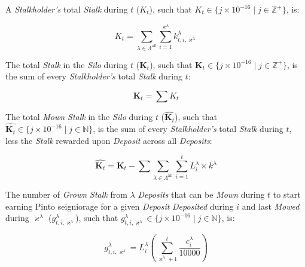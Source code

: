 \documentclass[tikz]{article}
\makeatletter
\newenvironment{keepunit}{%
  \par\penalty0\begingroup
  \edef\keepunitparskip{\the\parskip}%
  \noindent\begin{minipage}[t]{\linewidth}%
  \setlength{\parskip}{\keepunitparskip}%
  \@minipagefalse
}{%
  \end{minipage}\par\endgroup
}
\newcommand{\term}[1]{\textsl{#1}}
\makeatother
\begin{document}
\begin{keepunit}

A \term{Stalkholder's} total \term{Stalk} during $t$ ($K_{t}$), such that $K_{t} \in \{j \times 10^{-16} \mid j \in \mathbb{Z}^{+} \}$, is:

    $$
        K_{t} = 
            \sum_{\lambda \in \Lambda^{\text{all}}}
                \sum_{i=1}^{\varkappa^{\lambda}}
                    k_{t,i,\varkappa^{\lambda}}^{\lambda}
    $$
\end{keepunit}



\begin{keepunit}

The total \term{Stalk} in the \term{Silo} during $t$ ($\mathbf{K}_{t}$), such that $\mathbf{K}_{t} \in \{j \times 10^{-16} \mid j \in \mathbb{Z}^{+} \}$, is the sum of every \term{Stalkholder's} total \term{Stalk} during $t$:

    $$
        \mathbf{K}_{t} = 
            \sum{K_{t}}
    $$
\end{keepunit}





\begin{keepunit}
The total \term{Mown Stalk} in the \term{Silo} during $t$ ($\widehat{\mathbf{K}_{t}}$), such that $\widehat{\mathbf{K}_{t}} \in \{j \times 10^{-16} \mid j \in \mathbb{N} \}$, is the sum of every \term{Stalkholder's} total \term{Stalk} during $t$, less the \term{Stalk} rewarded upon \term{Deposit} across all \term{Deposits}:


    $$
        \widehat{\mathbf{K}_{t}} = 
            \mathbf{K}_{t} - \sum
            \sum_{\lambda \in \Lambda^{\text{all}}}
                \sum_{i=1}^{t}
                    L_{i}^{\lambda} \times k^{\lambda}
    $$
\end{keepunit}

\begin{keepunit}
The number of \term{Grown Stalk} from $\lambda$ \term{Deposits} that can be \term{Mown} during $t$ to start earning Pinto seigniorage for a given \term{Deposit} \term{Deposited} during $i$ and last \term{Mowed} during $\varkappa^{\lambda}$ ($g_{t,i,\varkappa^{\lambda}}^{\lambda}$), such that $g_{t,i,\varkappa^{\lambda}}^{\lambda} \in \{j \times 10^{-16} \mid j \in \mathbb{N} \}$, is:

    $$
        g_{t,i,\varkappa^{\lambda}}^{\lambda} = 
            L_{i}^{\lambda}\left
            (\sum_{\varkappa^{\lambda} + 1}^{t} 
                    \frac{c_{i}^{\lambda}}
                            {10000}
            \right)
    $$
\end{keepunit}
\end{document}
